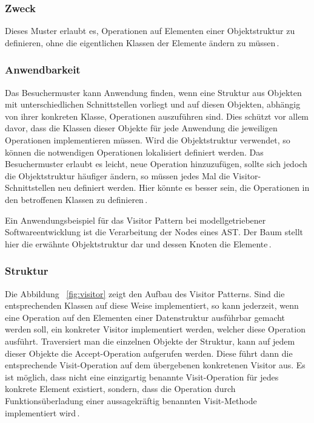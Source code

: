 \documentclass[12pt,oneside,a4paper,parskip]{scrbook}
\begin{document}
\subsubsection{Zweck}

Dieses Muster erlaubt es, Operationen auf Elementen einer Objektstruktur zu definieren, ohne die eigentlichen Klassen der Elemente ändern zu müssen\,\cite[S. 480]{gamma2015}.

\subsubsection{Anwendbarkeit}

Das Besuchermuster kann Anwendung finden, wenn eine Struktur aus Objekten mit unterschiedlichen Schnittstellen vorliegt und auf diesen Objekten, abhängig von ihrer konkreten Klasse, Operationen auszuführen sind. Dies schützt vor allem davor, dass die Klassen dieser Objekte für jede Anwendung die jeweiligen Operationen implementieren müssen. Wird die Objektstruktur verwendet, so können die notwendigen Operationen lokalisiert definiert werden. Das Besuchermuster erlaubt es leicht, neue Operation hinzuzufügen, sollte sich jedoch die Objektstruktur häufiger ändern, so müssen jedes Mal die Visitor-Schnittstellen neu definiert werden. Hier könnte es besser sein, die Operationen in den betroffenen Klassen zu definieren\,\cite[S. 484]{gamma2015}.

Ein Anwendungsbeispiel für das Visitor Pattern bei modellgetriebener Softwareentwicklung ist die Verarbeitung der Nodes eines AST. Der Baum stellt hier die erwähnte Objektstruktur dar und dessen Knoten die Elemente\,\cite[S. 480]{gamma2015}.

\subsubsection{Struktur}

Die Abbildung ~\ref{fig:visitor} zeigt den Aufbau des Visitor Patterns. Sind die entsprechenden Klassen auf diese Weise implementiert, so kann jederzeit, wenn eine Operation auf den Elementen einer Datenstruktur ausführbar gemacht werden soll, ein konkreter Visitor implementiert werden, welcher diese Operation ausführt. Traversiert man die einzelnen Objekte der Struktur, kann auf jedem dieser Objekte die Accept-Operation aufgerufen werden. Diese führt dann die entsprechende Visit-Operation auf dem übergebenen konkretenen Visitor aus. Es ist möglich, dass nicht eine einzigartig benannte Visit-Operation für jedes konkrete Element existiert, sondern, dass die Operation durch Funktionsüberladung einer aussagekräftig benannten Visit-Methode implementiert wird\,\cite[S.485 ff.]{gamma2015}.
\end{document}
